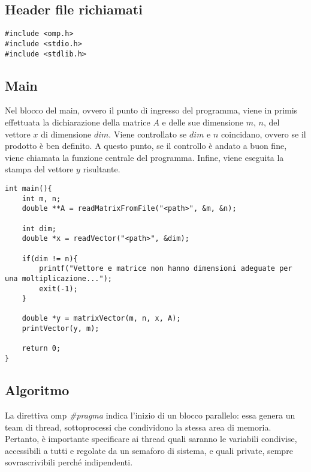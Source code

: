 \subsection{Header file richiamati}
\begin{lstlisting}
#include <omp.h>
#include <stdio.h>
#include <stdlib.h>
\end{lstlisting}

\subsection{Main}
Nel blocco del main, ovvero il punto di ingresso del programma, viene in primis effettuata la dichiarazione della matrice $A$ e delle sue dimensione $m$, $n$, del vettore $x$ di dimensione $dim$.
Viene controllato se $dim$ e $n$ coincidano, ovvero se il prodotto è ben definito.
A questo punto, se il controllo è andato  a buon fine, viene chiamata la funzione centrale del programma.
Infine, viene eseguita la stampa del vettore $y$ risultante.

\begin{lstlisting}
int main(){
    int m, n;
    double **A = readMatrixFromFile("<path>", &m, &n);

    int dim;
    double *x = readVector("<path>", &dim);

    if(dim != n){
        printf("Vettore e matrice non hanno dimensioni adeguate per una moltiplicazione...");
        exit(-1);
    }
    
    double *y = matrixVector(m, n, x, A);
    printVector(y, m);

    return 0;
}
\end{lstlisting}

\subsection{Algoritmo}
La direttiva omp \textit{\#pragma} indica l'inizio di un blocco parallelo: essa genera un team di thread, sottoprocessi che condividono la stessa area di memoria. Pertanto, è importante specificare ai thread quali saranno le variabili condivise, accessibili a tutti e regolate da un semaforo di sistema, e quali private, sempre sovrascrivibili perché indipendenti. 

